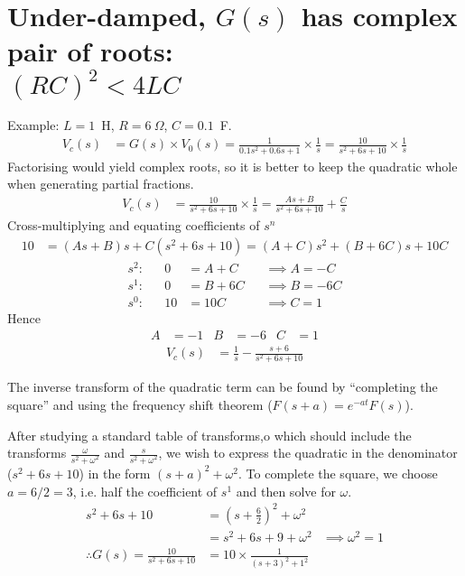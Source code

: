 \documentclass[a4paper,12pt]{article}
\begin{document}
\section*{Under-damped, $G(s)$ has complex pair of roots:\\$(RC)^2<4LC $}
Example: $L=1$~H, $R=6~\Omega$, $C=0.1$~F. %
\begin{align*}
  V_c(s) &= G(s) \times V_0(s)
  = \frac{1}{0.1 s^2 + 0.6 s + 1} \times \frac{1}{s}
  = \frac{10}{s^2 + 6 s + 10} \times \frac{1}{s}
\end{align*}
Factorising would yield complex roots, so it is better to keep the quadratic whole when generating partial fractions.
\begin{align*}
  V_c(s) &= \frac{10}{s^2+6 s + 10} \times \frac{1}{s} = \frac{A s + B}{s^2 + 6 s + 10} + \frac{C}{s}
\end{align*}
Cross-multiplying and equating coefficients of $s^n$
\begin{align*}
  10 &= (As + B)s + C(s^2+6s+10) = (A+C) s^2 + (B+6C) s + 10 C
\end{align*}
\begin{align*}
  s^2: && 0 &= A+C  &&\implies A = -C\\
  s^1: && 0 &= B+6C &&\implies B = -6C\\
  s^0: && 10 &= 10 C && \implies C = 1
\end{align*}
Hence
\begin{align*}
  A &= -1 & B &= -6 & C &= 1
\end{align*}
\begin{align*}
  V_c(s) &= \frac{1}{s} - \frac{s+6}{s^2+6s+10}
\end{align*}


The inverse transform of the quadratic term can be found by
``completing the square'' and using the frequency shift theorem
($F(s+a)=e^{-at}F(s)$).

After studying a standard table of transforms,o which should
include the transforms $\frac{\omega}{s^2+\omega^2}$ and
$\frac{s}{s^2+\omega^2}$, we wish to express the quadratic in the
denominator ($s^2+6s+10$) in the form $(s+a)^2+\omega^2$. To
complete the square, we choose $a=6/2=3$, i.e. half the
coefficient of $s^1$ and then solve for $\omega$.
\begin{align*}
  s^2+6s+10 &= \left(s+\frac{6}{2}\right)^2 + \omega^2 \\
  &= s^2 + 6s + 9 + \omega^2 
  &\implies \omega^2 = 1 \\
  \therefore G(s) = \frac{10}{s^2+6s+10} &= 10 \times \frac{1}{(s+3)^2+1^2}
\end{align*}
\end{document}
